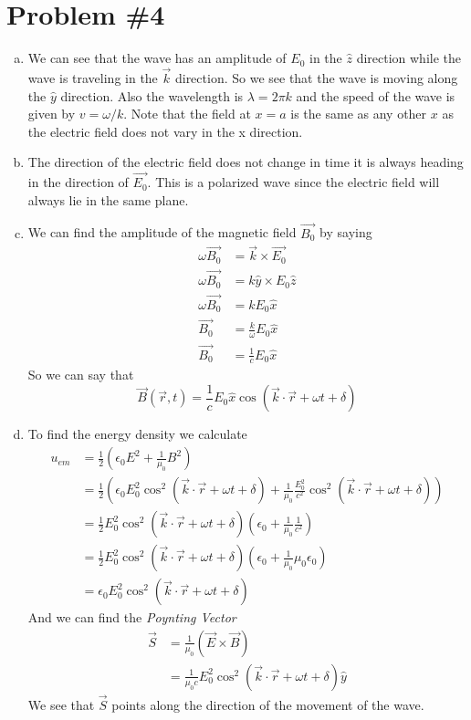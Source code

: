 \documentclass[11pt]{article}
\numberwithin{equation}{section}
\begin{document}
\section{Problem \#4}
\begin{enumerate}[(a)]
\item
We can see that the wave has an amplitude of $E_0$ in the $\hat{z}$ direction while the wave is traveling in the $\vec{k}$ direction. So we see that the wave is moving along the $\hat{y}$ direction. Also the wavelength is $\lambda = 2\pi k$ and the speed of the wave is given by $v = \omega/k$. Note that the field at $x=a$ is the same as any other $x$ as the electric field does not vary in the x direction. 

\item
The direction of the electric field does not change in time it is always heading in the direction of $\vec{E_0}$. This is a polarized wave since the electric field will always lie in the same plane.

\item
We can find the amplitude of the magnetic field $\vec{B_0}$ by saying
\begin{align*}
\omega\vec{B_0} &= \vec{k}\times\vec{E_0}\\
\omega\vec{B_0} &= k\hat{y}\times E_0\hat{z}\\
\omega\vec{B_0} &= kE_0\hat{x}\\
\vec{B_0} &= \frac{k}{\omega}E_0\hat{x}\\
\vec{B_0} &= \frac{1}{c}E_0\hat{x}
\end{align*}
So we can say that 
$$\vec{B}(\vec{r},t) = \frac{1}{c}E_0\hat{x}\cos(\vec{k}\cdot\vec{r}+\omega t+\delta)$$

\item
To find the energy density we calculate
\begin{align*}
u_{em} &= \frac{1}{2}\left(\epsilon_0E^2+\frac{1}{\mu_0}B^2\right)\\
&= \frac{1}{2}\left(\epsilon_0E_0^2\cos^2(\vec{k}\cdot\vec{r}+\omega t+\delta)+\frac{1}{\mu_0}\frac{E_0^2}{c^2}\cos^2(\vec{k}\cdot\vec{r}+\omega t+\delta)\right)\\
&= \frac{1}{2}E_0^2\cos^2(\vec{k}\cdot\vec{r}+\omega t+\delta)\left(\epsilon_0+\frac{1}{\mu_0}\frac{1}{c^2}\right)\\
&= \frac{1}{2}E_0^2\cos^2(\vec{k}\cdot\vec{r}+\omega t+\delta)\left(\epsilon_0+\frac{1}{\mu_0}\mu_0\epsilon_0\right)\\
&= \epsilon_0E_0^2\cos^2(\vec{k}\cdot\vec{r}+\omega t+\delta)
\end{align*}
And we can find the \emph{Poynting Vector} 
\begin{align*}
\vec{S} &= \frac{1}{\mu_0}(\vec{E}\times\vec{B})\\
&= \frac{1}{\mu_0c}E_0^2\cos^2(\vec{k}\cdot\vec{r}+\omega t+\delta)\hat{y}
\end{align*}
We see that $\vec{S}$ points along the direction of the movement of the wave.


\end{enumerate}
\end{document}
